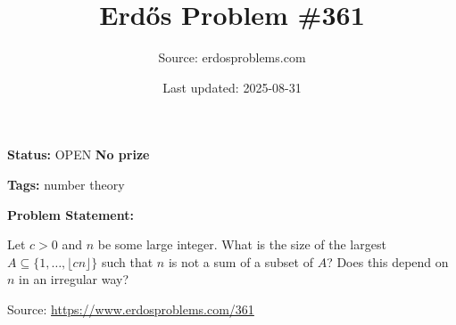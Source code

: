 \documentclass{article}
\title{Erd\H{o}s Problem \#361}
\date{Last updated: 2025-08-31}
\author{Source: erdosproblems.com}
\begin{document}
\maketitle

\noindent\textbf{Status:} OPEN \quad \textbf{No prize}

\noindent\textbf{Tags:} number theory

\medskip
\noindent\textbf{Problem Statement:}

Let $c>0$ and $n$ be some large integer. What is the size of the largest $A\subseteq \{1,\ldots,\lfloor cn\rfloor\}$ such that $n$ is not a sum of a subset of $A$? Does this depend on $n$ in an irregular way?

\bigskip
\noindent\small{Source: \url{https://www.erdosproblems.com/361}}
\end{document}

